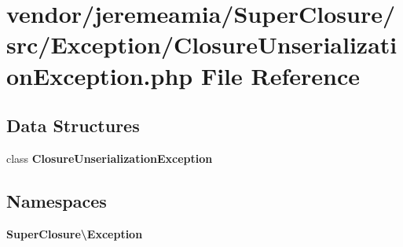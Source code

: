 \section{vendor/jeremeamia/\+Super\+Closure/src/\+Exception/\+Closure\+Unserialization\+Exception.php File Reference}
\label{_closure_unserialization_exception_8php}
\subsection*{Data Structures}
\begin{DoxyCompactItemize}
\item 
class {\bf Closure\+Unserialization\+Exception}
\end{DoxyCompactItemize}
\subsection*{Namespaces}
\begin{DoxyCompactItemize}
\item 
 {\bf Super\+Closure\textbackslash{}\+Exception}
\end{DoxyCompactItemize}
